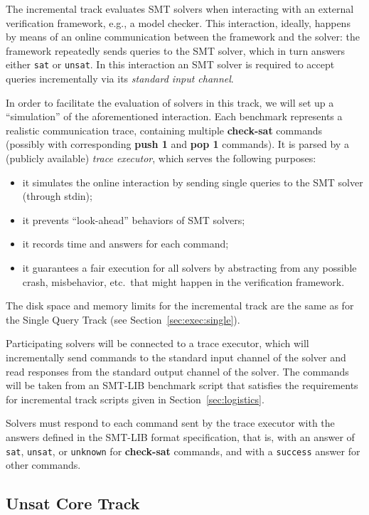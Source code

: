 \documentclass[12pt]{article}
\newcommand{\akey}[1]{\textbf{#1}}
\newcommand{\main}{Single Query\xspace}
\newcommand{\ucore}{Unsat Core\xspace}
\begin{document}
The incremental track evaluates SMT solvers when interacting with an
external verification framework, e.g., a model checker. This
interaction, ideally, happens by means of an online communication
between the framework and the solver: the framework repeatedly sends
queries to the SMT solver, which in turn answers either \texttt{sat}
or \texttt{unsat}.  In this interaction an SMT solver is required to
accept queries incrementally via its \emph{standard input channel}.

In order to facilitate the evaluation of solvers in this track, we will set up
a ``simulation'' of the aforementioned interaction.  Each benchmark represents
a realistic communication trace, containing multiple \akey{check-sat} commands
(possibly with corresponding \akey{push 1} and \akey{pop 1} commands). It is
parsed by a (publicly available) \emph{trace executor},
which serves the following purposes: \begin{itemize} \item it simulates the
online interaction by sending single queries to the SMT solver (through stdin);
\item it prevents ``look-ahead'' behaviors of SMT solvers;
\item it records time and answers for each command;
\item it guarantees a fair execution for all solvers by abstracting
  from any possible crash, misbehavior, etc.\ that might happen in the
  verification framework.
\end{itemize}

The disk space and memory limits for the incremental track are the
same as for the \main Track (see Section~\ref{sec:exec:single}).

%
Participating solvers will be connected to a trace executor, which
will incrementally send commands to the standard input channel of the
solver and read responses from the standard output channel of the
solver.  The commands will be taken from an SMT-LIB benchmark script
that satisfies the requirements for incremental track scripts given in
Section~\ref{sec:logistics}.

Solvers must respond to each command sent by the trace executor with
the answers defined in the SMT-LIB format specification, that is, with
an answer of \texttt{sat}, \texttt{unsat}, or \texttt{unknown} for
\akey{check-sat} commands, and with a \texttt{success} answer for
other commands.

\subsection{\ucore Track}
\label{sec:exec:unsat-core}
\end{document}
